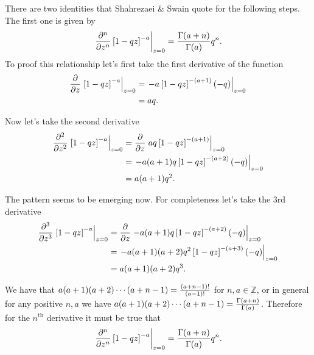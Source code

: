 There are two identities that Shahrezaei \& Swain quote for the following steps.
The first one is given by
\begin{equation}
    \left. {\partial ^n \over \partial z^n}
    \left[ 1 - q z \right]^{-a} \right\vert _{z=0} =
    {\Gamma(a + n) \over \Gamma(a)} q^n.
\end{equation}
To proof this relationship let's first take the first derivative of the function
\begin{align}
  {\partial \over \partial z}
  \left. \left[ 1 - q z \right]^{-a} \right\vert _{z=0}
  &= \left. -a \left[ 1 - q z \right]^{-(a + 1)} (-q) \right\vert _{z=0}\\
  &= a q.
\end{align}

Now let's take the second derivative
\begin{align}
  {\partial^2 \over \partial z^2}
  \left. \left[ 1 - q z \right]^{-a} \right\vert _{z=0}
  &= {\partial \over \partial z}
  \left. a q \left[ 1 - q z \right]^{-(a + 1)} \right\vert _{z=0}\\
  &= \left. -a (a + 1) q \left[ 1 - q z \right]^{-(a + 2)} (-q)
  \right\vert _{z=0} \\
  &= a(a + 1) q^2.
\end{align}

The pattern seems to be emerging now. For completeness let's take the 3rd
derivative
\begin{align}
  {\partial^3 \over \partial z^3}
  \left. \left[ 1 - q z \right]^{-a} \right\vert _{z=0}
  &= {\partial \over \partial z}
  \left. -a (a + 1) q \left[ 1 - q z \right]^{-(a + 2)} (-q)
  \right\vert _{z=0} \\
  &= \left. -a (a + 1) (a + 2) q^2
  \left[ 1 - q z \right]^{-(a + 3)} (-q) \right\vert _{z=0} \\
  &= a(a + 1) (a + 2) q^3.
\end{align}

We have that $a (a + 1) (a + 2) \cdots (a + n - 1) = {(a + n - 1)! \over (a -
1)!}$ for $n, a \in \mathbb{Z}$, or in general for any positive $n, a$ we have
$a (a + 1) (a + 2) \cdots (a + n - 1) = {\Gamma(a + n) \over \Gamma(a)}$.
Therefore for the $n^{\text{th}}$ derivative it must be true that
\begin{equation}
    \left. {\partial ^n \over \partial z^n}
    \left[ 1 - q z \right]^{-a} \right\vert _{z=0} =
    {\Gamma(a + n) \over \Gamma(a)} q^n.
    \label{eq_derivative_identity}
\end{equation}

